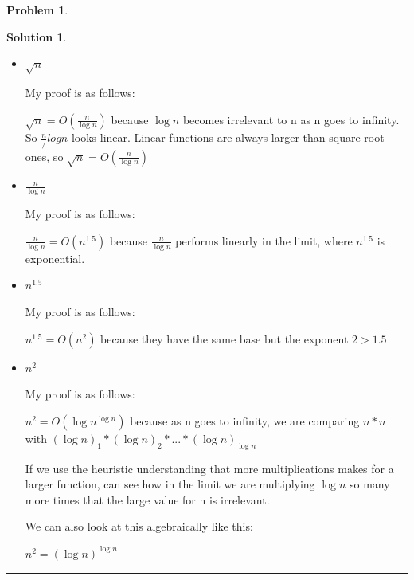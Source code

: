 \documentclass{article}
\theoremstyle{definition}
\newtheorem{problem}{Problem}
\def\fline{\rule{0.75\linewidth}{0.5pt}}
\newcommand{\finishline}{
  \begin{center}\fline
\end{center}}
\newtheorem*{solution*}{Solution}
\newenvironment{solution}{
\begin{solution*}}{{\finishline}
\end{solution*}}
\begin{document}
\begin{problem}
\begin{enumerate}
\begin{solution}
\begin{itemize}
            $\sqrt{n} - \log^3(n) >= 0$ This statement claims that $\sqrt(n)$ is bigger than $\log^3(n)$. We will solve to find if there exists a solution to this inequality.

            $n - (\log^3(n))^2 >=0$

            $n - (\log^6(n)) >= 0$

            $n >= \log^6 n$

            $ n^{1/6} >= \log n$

            $ b^{n^{1/6}} >= n$

            We know have an equaiton we can solve for all positive n for a base b that makes $ b^{n^{1/6}}$ greater than or equal to n and therefore we have proven that $\sqrt{n}$ will always domiante $\log^3 n$ as n goes to infinity.
          \item $\sqrt{n}$

            My proof is as follows:

            $\sqrt{n} = O(\frac{n}{\log{n}})$ because $\log{n}$ becomes irrelevant to n as n goes to infinity. So $\frac{n}/log{n}$ looks linear. Linear functions are always larger than square root ones, so $\sqrt{n} = O(\frac{n}{\log n})$
          \item $\frac{n}{\log n}$

            My proof is as follows:

            $\frac{n}{\log n} = O(n^{1.5})$ because $\frac{n}{\log n}$ performs linearly in the limit, where $n^{1.5}$ is exponential.
          \item $n^{1.5}$

            My proof is as follows:

            $n^{1.5} = O(n^2)$ because they have the same base but the exponent $2>1.5$
          \item $n^2$

            My proof is as follows:

            $n^2 = O(\log n^{\log n})$ because as n goes to infinity, we are comparing $n*n$ with $ ({\log n})_1 * ({\log n})_2 * ... * ({\log n})_{\log n}$

            If we use the heuristic understanding that more multiplications makes for a larger function, can see how in the limit we are multiplying $\log n$ so many more times that the large value for n is irrelevant.

            We can also look at this algebraically like this:

            $ n^2 = (\log n)^{\log n}$


\end{itemize}
\end{solution}
\end{enumerate}
\end{problem}
\end{document}
